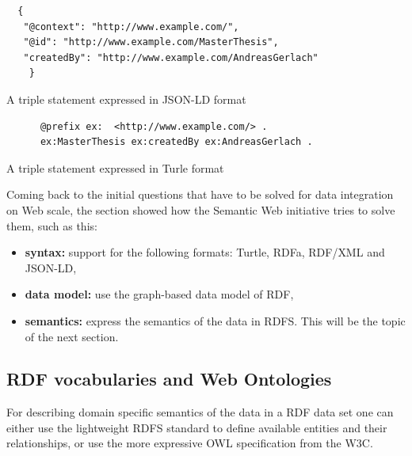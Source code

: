 \begin{listing}[H]
	\begin{verbatim}
  {
   "@context": "http://www.example.com/",
   "@id": "http://www.example.com/MasterThesis",
   "createdBy": "http://www.example.com/AndreasGerlach"
 	}
	\end{verbatim}
\caption{A triple statement expressed in \gls{JSON-LD} format}
\label{lst:jsonld_meta_data}
\end{listing}

\begin{listing}[H]
	\begin{verbatim}
	  @prefix ex:  <http://www.example.com/> .
	  ex:MasterThesis ex:createdBy ex:AndreasGerlach .
	\end{verbatim}
\caption{A triple statement expressed in Turle format}
\label{lst:turtle_meta_data}
\end{listing}

Coming back to the initial questions that have to be solved for data integration on Web scale, the section showed how the Semantic Web initiative tries to solve them, such as this: \@

\begin{itemize}
	\item \textbf{syntax:} support for the following formats: Turtle, \gls{RDFa}, \gls{RDF}/\gls{XML} and \gls{JSON-LD},
	\item \textbf{data model:} use the graph-based data model of \gls{RDF},
	\item \textbf{semantics:} express the semantics of the data in \gls{RDFS}. This will be the topic of the next section.
\end{itemize}


\subsection{\gls{RDF} vocabularies and Web Ontologies}
\label{sec:semantic_vocab_ontologies}

For describing domain specific semantics of the data in a \gls{RDF} data set one can either use the lightweight \gls{RDFS} standard to define available entities and their relationships, or use the more expressive \gls{OWL} specification from the \gls{W3C}. \\

